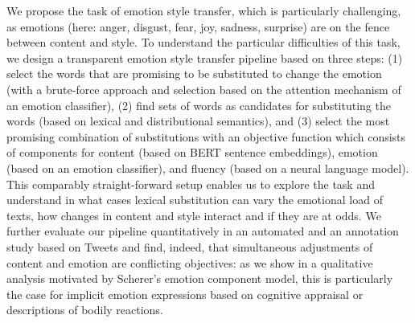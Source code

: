 We propose the task of emotion style transfer, which is particularly challenging, as emotions (here: anger, disgust, fear, joy, sadness, surprise) are on the fence between content and style. To understand the particular difficulties of this task, we design a transparent emotion style transfer pipeline based on three steps: (1) select the words that are promising to be substituted to change the emotion (with a brute-force approach and selection based on the attention mechanism of an emotion classifier), (2) find sets of words as candidates for substituting the words (based on lexical and distributional semantics), and (3) select the most promising combination of substitutions with an objective function which consists of components for content (based on BERT sentence embeddings), emotion (based on an emotion classifier), and fluency (based on a neural language model). This comparably straight-forward setup enables us to explore the task and understand in what cases lexical substitution can vary the emotional load of texts, how changes in content and style interact and if they are at odds. We further evaluate our pipeline quantitatively in an automated and an annotation study based on Tweets and find, indeed, that simultaneous adjustments of content and emotion are conflicting objectives: as we show in a qualitative analysis motivated by Scherer's emotion component model, this is particularly the case for implicit emotion expressions based on cognitive appraisal or descriptions of bodily reactions.

